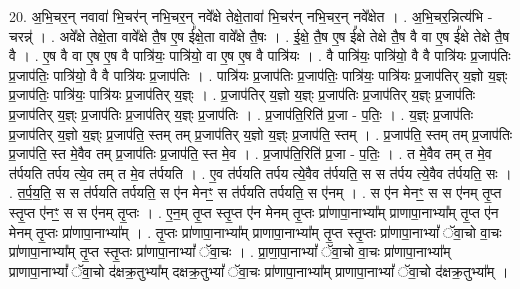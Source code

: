\documentclass[17pt]{extarticle}
\begin{document}
20. अ॒भि॒चर॒न् नवावा॑ भि॒चर॑न् नभि॒चर॒न् नवे᳚क्षे तेक्षे॒तावा॑ भि॒चर॑न् नभि॒चर॒न् नवे᳚क्षेत । . अ॒भि॒चर॒न्नित्य॑भि - चरन्न्॑ । . अवे᳚क्षे तेक्षे॒ता वावे᳚क्षे तै॒ष ए॒ष ई᳚क्षे॒ता वावे᳚क्षे तै॒षः । . ई॒क्षे॒ तै॒ष ए॒ष ई᳚क्षे तेक्षे तै॒ष वै वा ए॒ष ई᳚क्षे तेक्षे तै॒ष वै । . ए॒ष वै वा ए॒ष ए॒ष वै पात्रि॑यः॒ पात्रि॑यो॒ वा ए॒ष ए॒ष वै पात्रि॑यः । . वै पात्रि॑यः॒ पात्रि॑यो॒ वै वै पात्रि॑यः प्र॒जाप॑तिः प्र॒जाप॑तिः॒ पात्रि॑यो॒ वै वै पात्रि॑यः प्र॒जाप॑तिः । . पात्रि॑यः प्र॒जाप॑तिः प्र॒जाप॑तिः॒ पात्रि॑यः॒ पात्रि॑यः प्र॒जाप॑तिर् य॒ज्ञो य॒ज्ञ्ः प्र॒जाप॑तिः॒ पात्रि॑यः॒ पात्रि॑यः प्र॒जाप॑तिर् य॒ज्ञ्ः । . प्र॒जाप॑तिर् य॒ज्ञो य॒ज्ञ्ः प्र॒जाप॑तिः प्र॒जाप॑तिर् य॒ज्ञ्ः प्र॒जाप॑तिः प्र॒जाप॑तिर् य॒ज्ञ्ः प्र॒जाप॑तिः प्र॒जाप॑तिर् य॒ज्ञ्ः प्र॒जाप॑तिः । . प्र॒जाप॑ति॒रिति॑ प्र॒जा - प॒तिः॒ । . य॒ज्ञ्ः प्र॒जाप॑तिः प्र॒जाप॑तिर् य॒ज्ञो य॒ज्ञ्ः प्र॒जाप॑ति॒ स्तम् तम् प्र॒जाप॑तिर् य॒ज्ञो य॒ज्ञ्ः प्र॒जाप॑ति॒ स्तम् । . प्र॒जाप॑ति॒ स्तम् तम् प्र॒जाप॑तिः प्र॒जाप॑ति॒ स्त मे॒वैव तम् प्र॒जाप॑तिः प्र॒जाप॑ति॒ स्त मे॒व । . प्र॒जाप॑ति॒रिति॑ प्र॒जा - प॒तिः॒ । . त मे॒वैव तम् त मे॒व त॑र्पयति तर्पय त्ये॒व तम् त मे॒व त॑र्पयति । . ए॒व त॑र्पयति तर्पय त्ये॒वैव त॑र्पयति॒ स स त॑र्पय त्ये॒वैव त॑र्पयति॒ सः । . त॒र्प॒य॒ति॒ स स त॑र्पयति तर्पयति॒ स ए॑न मेनꣳ॒॒ स त॑र्पयति तर्पयति॒ स ए॑नम् । . स ए॑न मेनꣳ॒॒ स स ए॑नम् तृ॒प्त स्तृ॒प्त ए॑नꣳ॒॒ स स ए॑नम् तृ॒प्तः । . ए॒न॒म् तृ॒प्त स्तृ॒प्त ए॑न मेनम् तृ॒प्तः प्रा॑णापा॒नाभ्या᳚म् प्राणापा॒नाभ्या᳚म् तृ॒प्त ए॑न मेनम् तृ॒प्तः प्रा॑णापा॒नाभ्या᳚म् । . तृ॒प्तः प्रा॑णापा॒नाभ्या᳚म् प्राणापा॒नाभ्या᳚म् तृ॒प्त स्तृ॒प्तः प्रा॑णापा॒नाभ्यां᳚ ॅवा॒चो वा॒चः प्रा॑णापा॒नाभ्या᳚म् तृ॒प्त स्तृ॒प्तः प्रा॑णापा॒नाभ्यां᳚ ॅवा॒चः । . प्रा॒णा॒पा॒नाभ्यां᳚ ॅवा॒चो वा॒चः प्रा॑णापा॒नाभ्या᳚म् प्राणापा॒नाभ्यां᳚ ॅवा॒चो द॑क्षक्र॒तुभ्या᳚म् दक्षक्र॒तुभ्यां᳚ ॅवा॒चः प्रा॑णापा॒नाभ्या᳚म् प्राणापा॒नाभ्यां᳚ ॅवा॒चो द॑क्षक्र॒तुभ्या᳚म् । \newline
\end{document}
